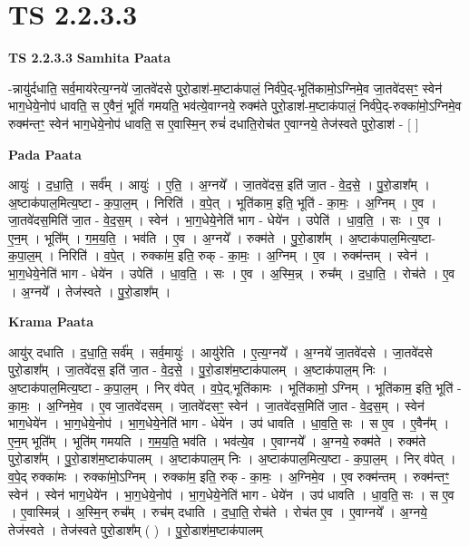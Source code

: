 \documentclass[17pt]{extarticle}
\begin{document}
\section*{ TS 2.2.3.3 }

\textbf{TS 2.2.3.3 } \newline
\textbf{Samhita Paata} \newline

-न्नायु॑र्दधाति॒ सर्व॒माय॑रेत्य॒ग्नये॑ जा॒तवे॑दसे पुरो॒डाश॑-म॒ष्टाक॑पालं॒ निर्व॑पे॒द्-भूति॑कामो॒ऽग्निमे॒व जा॒तवे॑दसꣳ॒॒ स्वेन॑ भाग॒धेये॒नोप॑ धावति॒ स ए॒वैनं॒ भूतिं॑ गमयति॒ भव॑त्ये॒वाग्नये॒ रुक्म॑ते पुरो॒डाश॑-म॒ष्टाक॑पालं॒ निर्व॑पे॒द्-रुक्का॑मो॒ऽग्निमे॒व रुक्म॑न्तꣳ॒॒ स्वेन॑ भाग॒धेये॒नोप॑ धावति॒ स ए॒वास्मि॒न् रुचं॑ दधाति॒रोच॑त ए॒वाग्नये॒ तेज॑स्वते पुरो॒डाश॑ - [  ] \newline

\textbf{Pada Paata} \newline

आयुः॑ । द॒धा॒ति॒ । सर्व᳚म् । आयुः॑ । ए॒ति॒ । अ॒ग्नये᳚ । जा॒तवे॑दस॒ इति॑ जा॒त - वे॒द॒से॒ । पु॒रो॒डाश᳚म् । अ॒ष्टाक॑पाल॒मित्य॒ष्टा - क॒पा॒ल॒म् । निरिति॑ । व॒पे॒त् । भूति॑काम॒ इति॒ भूति॑ - का॒मः॒ । अ॒ग्निम् । ए॒व । जा॒तवे॑दस॒मिति॑ जा॒त - वे॒द॒स॒म् । स्वेन॑ । भा॒ग॒धेये॒नेति॑ भाग - धेये॑न । उपेति॑ । धा॒व॒ति॒ । सः । ए॒व । ए॒न॒म् । भूति᳚म् । ग॒म॒य॒ति॒ । भव॑ति । ए॒व । अ॒ग्नये᳚ । रुक्म॑ते । पु॒रो॒डाश᳚म् । अ॒ष्टाक॑पाल॒मित्य॒ष्टा-क॒पा॒ल॒म् । निरिति॑ । व॒पे॒त् । रुक्का॑म॒ इति॒ रुक् - का॒मः॒ । अ॒ग्निम् । ए॒व । रुक्म॑न्तम् । स्वेन॑ । भा॒ग॒धेये॒नेति॑ भाग - धेये॑न । उपेति॑ । धा॒व॒ति॒ । सः । ए॒व । अ॒स्मि॒न्न् । रुच᳚म् । द॒धा॒ति॒ । रोच॑ते । ए॒व । अ॒ग्नये᳚ । तेज॑स्वते । पु॒रो॒डाश᳚म् ।  \newline


\textbf{Krama Paata} \newline

आयु॑र् दधाति । द॒धा॒ति॒ सर्व᳚म् । सर्व॒मायुः॑ । आयु॑रेति । ए॒त्य॒ग्नये᳚ । अ॒ग्नये॑ जा॒तवे॑दसे । जा॒तवे॑दसे पुरो॒डाश᳚म् । जा॒तवे॑दस॒ इति॑ जा॒त - वे॒द॒से॒ । पु॒रो॒डाश॑म॒ष्टाक॑पालम् । अ॒ष्टाक॑पाल॒म् निः । अ॒ष्टाक॑पाल॒मित्य॒ष्टा - क॒पा॒ल॒म् । निर् व॑पेत् । व॒पे॒द्,भूति॑कामः । भूति॑कामो॒ ऽग्निम् । भूति॑काम॒ इति॒ भूति॑ - का॒मः॒ । अ॒ग्निमे॒व । ए॒व जा॒तवे॑दसम् । जा॒तवे॑दसꣳ॒॒ स्वेन॑ । जा॒तवे॑दस॒मिति॑ जा॒त - वे॒द॒स॒म् । स्वेन॑ भाग॒धेये॑न । भा॒ग॒धेये॒नोप॑ । भा॒ग॒धेये॒नेति॑ भाग - धेये॑न । उप॑ धावति । धा॒व॒ति॒ सः । स ए॒व । ए॒वैन᳚म् । ए॒न॒म् भूति᳚म् । भूति॑म् गमयति । ग॒म॒य॒ति॒ भव॑ति । भव॑त्ये॒व । ए॒वाग्नये᳚ । अ॒ग्नये॒ रुक्म॑ते । रुक्म॑ते पुरो॒डाश᳚म् । पु॒रो॒डाश॑म॒ष्टाक॑पालम् । अ॒ष्टाक॑पाल॒म् निः । अ॒ष्टाक॑पाल॒मित्य॒ष्टा - क॒पा॒ल॒म् । निर् व॑पेत् । व॒पे॒द् रुक्का॑मः । रुक्का॑मो॒ऽग्निम् । रुक्का॑म॒ इति॒ रुक् - का॒मः॒ । अ॒ग्निमे॒व । ए॒व रुक्म॑न्तम् । रुक्म॑न्तꣳ॒॒ स्वेन॑ । स्वेन॑ भाग॒धेये॑न । भा॒ग॒धेये॒नोप॑ । भा॒ग॒धेये॒नेति॑ भाग - धेये॑न । उप॑ धावति । धा॒व॒ति॒ सः । स ए॒व । ए॒वास्मिन्न्॑ । अ॒स्मि॒न् रुच᳚म् । रुच॑म् दधाति । द॒धा॒ति॒ रोच॑ते । रोच॑त ए॒व । ए॒वाग्नये᳚ । अ॒ग्नये॒ तेज॑स्वते । तेज॑स्वते पुरो॒डाश᳚म् ( ) । पु॒रो॒डाश॑म॒ष्टाक॑पालम् \newline
\end{document}
